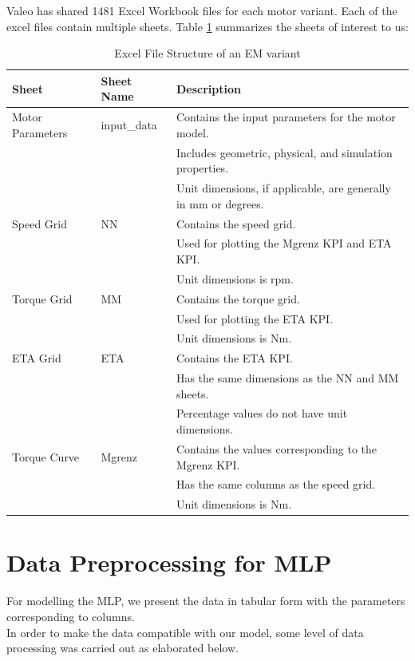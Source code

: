 \documentclass{report} %
\begin{document}
Valeo has shared 1481 Excel Workbook files for each motor variant. Each of the excel files contain multiple sheets.
Table \ref{tab:Excel File Structure} summarizes the sheets of interest to us:
\begin{table}[H]
    \centering
    \begin{tabular}{|p{3cm}|p{2.5cm}|p{10cm}|}
    \hline 
    {\bf Sheet} & {\bf Sheet Name} & {\bf Description} \\
    \hline 
    Motor Parameters & input\_data & 
    Contains the input parameters for the motor model. \\
    & & Includes geometric, physical, and simulation properties. \\
    & & Unit dimensions, if applicable, are generally in mm or degrees. \\
    Speed Grid & NN & 
    Contains the speed grid. \\
    & & Used for plotting the Mgrenz \ac{KPI} and ETA \ac{KPI}. \\
    & & Unit dimensions is rpm. \\
    Torque Grid & MM & 
    Contains the torque grid. \\
    & & Used for plotting the ETA \ac{KPI}. \\
    & & Unit dimensions is Nm. \\
    ETA Grid & ETA & 
    Contains the ETA \ac{KPI}. \\
    & & Has the same dimensions as the NN and MM sheets. \\
    & & Percentage values do not have unit dimensions. \\
    Torque Curve & Mgrenz & 
    Contains the values corresponding to the Mgrenz \ac{KPI}. \\
    & & Has the same columns as the speed grid. \\
    & & Unit dimensions is Nm. \\
    \hline 
    \end{tabular}
    \caption{Excel File Structure of an \ac{EM} variant}
    \label{tab:Excel File Structure}
\end{table}



\section{Data Preprocessing for \ac{MLP}}\label{sec:Data Preprocessing for MLP}

For modelling the \ac{MLP}, we present the data in tabular form with the parameters corresponding to columns. \\
In order to make the data compatible with our model, some level of data processing was carried out as elaborated below.
\end{document}
